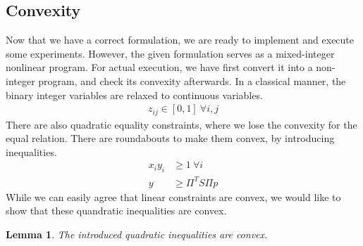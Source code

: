 \documentclass[12pt,letterpaper]{article}
\newtheorem{lemma}[theorem]{Lemma}
\begin{document}
\subsection{Convexity}
Now that we have a correct formulation, we are ready to implement and execute some experiments.
However, the given formulation serves as a mixed-integer nonlinear program. 
For actual execution, we have first convert it into a non-integer program, and check its convexity afterwards.
In a classical manner, the binary integer variables are relaxed to continuous variables.
\begin{align*}
 z_{ij} \in [0, 1] \ \forall i, j
\end{align*}
There are also quadratic equality constraints, where we lose the convexity for the equal relation. 
There are roundabouts to make them convex, by introducing inequalities. 
\begin{align*}
 x_i y_i &\geq 1 \ \forall i \\
 y &\geq \Pi^T S \Pi p
\end{align*}
While we can easily agree that linear constraints are convex, we would like to 
show that these quandratic inequalities are convex.
\begin{lemma}
    The introduced quadratic inequalities are convex.
\end{lemma}
\end{document}
